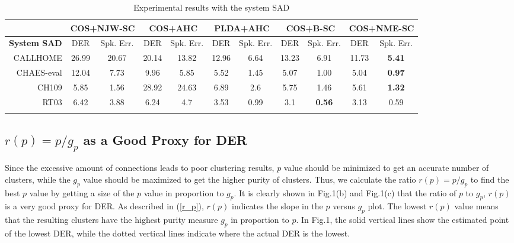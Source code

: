 \documentclass[journal]{IEEEtran}
\begin{document}
\begin{table*}[t]
\caption{Experimental results with the system SAD}
\vspace{-1.4ex}
\small
\centering
 \begin{tabular}{ r | c c | c c | c c | c c | c c } 
 \Xhline{3\arrayrulewidth}
 \label{tab:system_SAD}
 & \multicolumn{2}{c}{ COS+NJW-SC } & \multicolumn{2}{c}{ COS+AHC } & \multicolumn{2}{c}{ PLDA+AHC } & \multicolumn{2}{c}{COS+B-SC} & \multicolumn{2}{c}{ COS+NME-SC } \\
 \hline
\textbf{System SAD} & DER & Spk. Err. & DER & Spk. Err. & DER & Spk. Err. & DER & Spk. Err. & DER & Spk. Err. \\
\Xhline{3\arrayrulewidth}
 CALLHOME & 26.99 & 20.67 & 20.14 & 13.82 & 12.96 & 6.64 & 13.23 & 6.91 & 11.73 & \textbf{5.41} \\ 
CHAES-eval& 12.04 & 7.73 & 9.96  & 5.85 & 5.52 & 1.45 & 5.07 & 1.00 & 5.04 & \textbf{0.97} \\
CH109 & 5.85 & 1.56 & 28.92 & 24.63 & 6.89 & 2.6 & 5.75 & 1.46 & 5.61 & \textbf{1.32} \\
 
RT03 & 6.42 & 3.88 & 6.24 & 4.7 &   3.53 & 0.99 & 3.1 & \textbf{0.56} & 3.13 & 0.59  \\


\Xhline{3\arrayrulewidth}
\end{tabular}
\vspace{-2.0ex}
\end{table*}

\vspace{-2.0ex}
\subsection{$r(p)=p/g_p$ as a Good Proxy for DER}
Since the excessive amount of connections leads to poor clustering results, $p$ value should be minimized to get an accurate number of clusters, while the $g_p$ value should be maximized to get the higher purity of clusters. Thus, we calculate the ratio $r(p)=p/g_p$ to find the best $p$ value by getting a size of the $p$ value in proportion to $g_p$. It is clearly shown in Fig.1(b) and Fig.1(c) that the ratio of $p$ to $g_p$, $r(p)$ is a very good proxy for DER. As described in (\ref{r_p}),  $r(p)$ indicates the slope in the $p$ versus $g_p$ plot. The lowest $r(p)$ value means that the resulting clusters have the highest purity measure $g_p$ in proportion to $p$. In Fig.1, the solid vertical lines show the estimated point of the lowest DER, while the dotted vertical lines indicate where the actual DER is the lowest.
\end{document}
